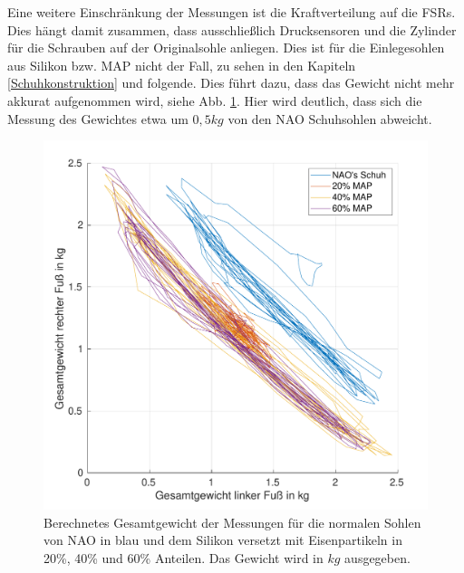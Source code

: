 Eine weitere Einschränkung der Messungen ist die Kraftverteilung auf die FSRs. Dies hängt damit zusammen, dass ausschließlich Drucksensoren und die Zylinder für die Schrauben auf der Originalsohle anliegen. Dies ist für die Einlegesohlen aus Silikon bzw. MAP nicht der Fall, zu sehen in den Kapiteln \ref{Schuhkonstruktion} und folgende. Dies führt dazu, dass das Gewicht nicht mehr akkurat aufgenommen wird, siehe Abb. \ref{total_weight}. Hier wird deutlich, dass sich die Messung des Gewichtes etwa um $0,5 \unit{kg}$ von den NAO Schuhsohlen abweicht. 
\begin{figure}[tb]
	\centering
	\includegraphics[width=0.8\linewidth]{Bilder/TotalWeight_Grund_20_40_60_mean.pdf}
	\caption{Berechnetes Gesamtgewicht der Messungen für die normalen Sohlen von NAO in blau und dem Silikon versetzt mit Eisenpartikeln in 20\%, 40\% und 60\% Anteilen. Das Gewicht wird in $\unit{kg}$ ausgegeben.}
	\label{total_weight}
\end{figure}

